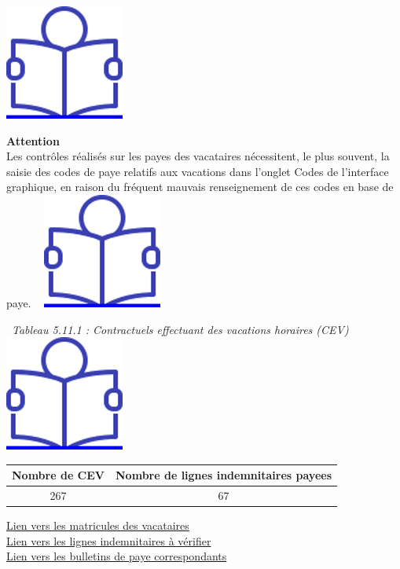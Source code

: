 \href{../Docs/Notices/fiche_CEV_droit.odt}{\includegraphics{icones/Notice.png}}

\textbf{Attention}\\
Les contrôles réalisés sur les payes des vacataires nécessitent, le plus
souvent, la saisie des codes de paye relatifs aux vacations dans
l'onglet Codes de l'interface graphique, en raison du fréquent mauvais
renseignement de ces codes en base de paye. ~
\href{../Docs/Notices/fiche_onglet_codes.odt}{\includegraphics{icones/Notice.png}}

~\emph{Tableau 5.11.1 : Contractuels effectuant des vacations horaires
(CEV)} ~
\href{../Docs/Notices/fiche_CEV_horaires.odt}{\includegraphics{icones/Notice.png}}

\begin{longtable}[]{@{}cc@{}}
\toprule
Nombre de CEV & Nombre de lignes indemnitaires payees\tabularnewline
\midrule
\endhead
267 & 67\tabularnewline
\bottomrule
\end{longtable}

\href{../Bases/Reglementation/matricules.contractuels.et.vacations.csv}{Lien
vers les matricules des vacataires}\\
\href{../Bases/Reglementation/RI.et.vacations.csv}{Lien vers les lignes
indemnitaires à vérifier}\\
\href{../Bases/Reglementation/Paie_vac_contr.csv}{Lien vers les bulletins
de paye correspondants}

